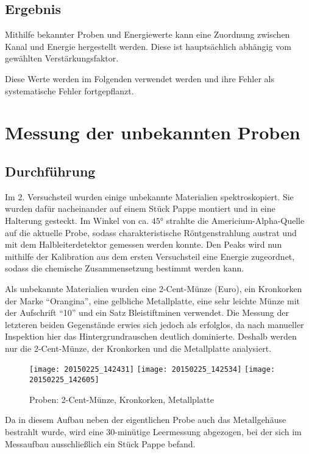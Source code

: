 \documentclass{../Misc/MontavonLaTeX/Montavon}
\newcommand{\thirdwidth}{0.32\textwidth}
\begin{document}
\subsection{Ergebnis}
Mithilfe bekannter Proben und Energiewerte kann eine Zuordnung zwischen Kanal und Energie hergestellt werden. Diese ist hauptsächlich abhängig vom gewählten Verstärkungsfaktor. 

Diese Werte werden im Folgenden verwendet werden und ihre Fehler als systematische Fehler fortgepflanzt.

\section{Messung der unbekannten Proben}
\subsection{Durchführung}
Im 2. Versuchsteil wurden einige unbekannte Materialien spektroskopiert. Sie wurden dafür nacheinander auf einem Stück Pappe montiert und in eine Halterung gesteckt. Im Winkel von ca. $45 \unit{\degree}$ strahlte die Americium-Alpha-Quelle auf die aktuelle Probe, sodass charakteristische Röntgenstrahlung austrat und mit dem Halbleiterdetektor gemessen werden konnte.
Den Peaks wird nun mithilfe der Kalibration aus dem ersten Versuchsteil eine Energie zugeordnet, sodass die chemische Zusammensetzung bestimmt werden kann.

Als unbekannte Materialien wurden eine 2-Cent-Münze (Euro), ein Kronkorken der Marke \enquote{Orangina}, eine gelbliche Metallplatte, eine sehr leichte Münze mit der Aufschrift \enquote{10} und ein Satz Bleistiftminen verwendet.
Die Messung der letzteren beiden Gegenstände erwies sich jedoch als erfolglos, da nach manueller Inspektion hier das Hintergrundrauschen deutlich dominierte. 
Deshalb werden nur die 2-Cent-Münze, der Kronkorken und die Metallplatte analysiert.

\begin{figure}[htbp]
\centering
\texttt{[image: 20150225\_142431]}
\texttt{[image: 20150225\_142534]}
\texttt{[image: 20150225\_142605]}
\caption{Proben: 2-Cent-Münze, Kronkorken, Metallplatte}
\end{figure}

Da in diesem Aufbau neben der eigentlichen Probe auch das Metallgehäuse bestrahlt wurde, wird eine 30-minütige Leermessung abgezogen, bei der sich im Messaufbau ausschließlich ein Stück Pappe befand.
\end{document}
